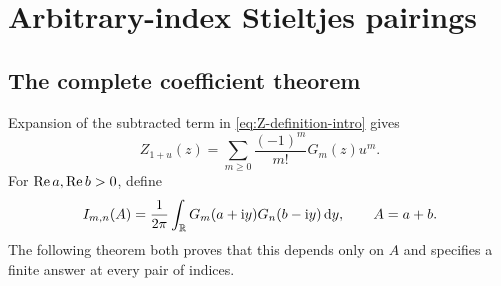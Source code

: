 \section{Arbitrary-index Stieltjes pairings}
\label{sec:stieltjes}

\subsection{The complete coefficient theorem}
Expansion of the subtracted term in \eqref{eq:Z-definition-intro} gives
\begin{equation}\label{eq:Z-G-expansion}
 Z_{1+u}(z)=\sum_{m\ge0}\frac{(-1)^m}{m!}G_m(z)u^m.
\end{equation}
For $\operatorname{Re} a,\operatorname{Re} b>0$, define
\begin{equation}\label{eq:Imn}
 I_{m,n}(A)=\frac1{2\pi}\int_{\mathbb R}
            G_m(a+\mathrm i y)G_n(b-\mathrm i y)\,\mathrm d y,
 \qquad A=a+b.
\end{equation}
The following theorem both proves that this depends only on $A$ and
specifies a finite answer at every pair of indices.


